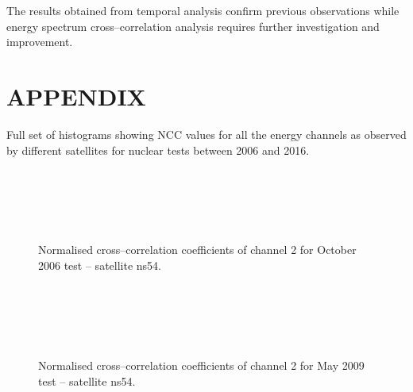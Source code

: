\documentclass[twocolumn,prl,nobalancelastpage,aps,10pt,floatfix]{revtex4-1}
\begin{document}
 The results obtained from temporal analysis confirm previous observations while energy spectrum cross--correlation analysis requires further investigation and improvement.
 
 \section{APPENDIX}
 
 Full set of histograms showing NCC values for all the energy channels as observed by different satellites for nuclear tests between 2006 and 2016.
 
 \begin{figure}
 	\\
 	\\
 	\\
 	\\
 	\caption{Normalised cross--correlation coefficients of channel 2 for October 2006 test -- satellite ns54.}
 	\label{6ns54}
 \end{figure}
 
  \begin{figure}
 	\\
 	\\
 	\\
 	\\
 	\caption{Normalised cross--correlation coefficients of channel 2 for May 2009 test -- satellite ns54.}
 	\label{9ns54}
 \end{figure}
\end{document}
